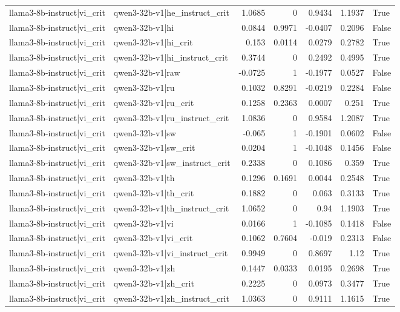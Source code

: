 \begin{table}
\begin{tabular}{l l r r r r l}
llama3-8b-instruct|vi_crit & qwen3-32b-v1|he_instruct_crit & 1.0685 & 0 & 0.9434 & 1.1937 & True \\
llama3-8b-instruct|vi_crit & qwen3-32b-v1|hi & 0.0844 & 0.9971 & -0.0407 & 0.2096 & False \\
llama3-8b-instruct|vi_crit & qwen3-32b-v1|hi_crit & 0.153 & 0.0114 & 0.0279 & 0.2782 & True \\
llama3-8b-instruct|vi_crit & qwen3-32b-v1|hi_instruct_crit & 0.3744 & 0 & 0.2492 & 0.4995 & True \\
llama3-8b-instruct|vi_crit & qwen3-32b-v1|raw & -0.0725 & 1 & -0.1977 & 0.0527 & False \\
llama3-8b-instruct|vi_crit & qwen3-32b-v1|ru & 0.1032 & 0.8291 & -0.0219 & 0.2284 & False \\
llama3-8b-instruct|vi_crit & qwen3-32b-v1|ru_crit & 0.1258 & 0.2363 & 0.0007 & 0.251 & True \\
llama3-8b-instruct|vi_crit & qwen3-32b-v1|ru_instruct_crit & 1.0836 & 0 & 0.9584 & 1.2087 & True \\
llama3-8b-instruct|vi_crit & qwen3-32b-v1|sw & -0.065 & 1 & -0.1901 & 0.0602 & False \\
llama3-8b-instruct|vi_crit & qwen3-32b-v1|sw_crit & 0.0204 & 1 & -0.1048 & 0.1456 & False \\
llama3-8b-instruct|vi_crit & qwen3-32b-v1|sw_instruct_crit & 0.2338 & 0 & 0.1086 & 0.359 & True \\
llama3-8b-instruct|vi_crit & qwen3-32b-v1|th & 0.1296 & 0.1691 & 0.0044 & 0.2548 & True \\
llama3-8b-instruct|vi_crit & qwen3-32b-v1|th_crit & 0.1882 & 0 & 0.063 & 0.3133 & True \\
llama3-8b-instruct|vi_crit & qwen3-32b-v1|th_instruct_crit & 1.0652 & 0 & 0.94 & 1.1903 & True \\
llama3-8b-instruct|vi_crit & qwen3-32b-v1|vi & 0.0166 & 1 & -0.1085 & 0.1418 & False \\
llama3-8b-instruct|vi_crit & qwen3-32b-v1|vi_crit & 0.1062 & 0.7604 & -0.019 & 0.2313 & False \\
llama3-8b-instruct|vi_crit & qwen3-32b-v1|vi_instruct_crit & 0.9949 & 0 & 0.8697 & 1.12 & True \\
llama3-8b-instruct|vi_crit & qwen3-32b-v1|zh & 0.1447 & 0.0333 & 0.0195 & 0.2698 & True \\
llama3-8b-instruct|vi_crit & qwen3-32b-v1|zh_crit & 0.2225 & 0 & 0.0973 & 0.3477 & True \\
llama3-8b-instruct|vi_crit & qwen3-32b-v1|zh_instruct_crit & 1.0363 & 0 & 0.9111 & 1.1615 & True \\

\end{tabular}
\end{table}
